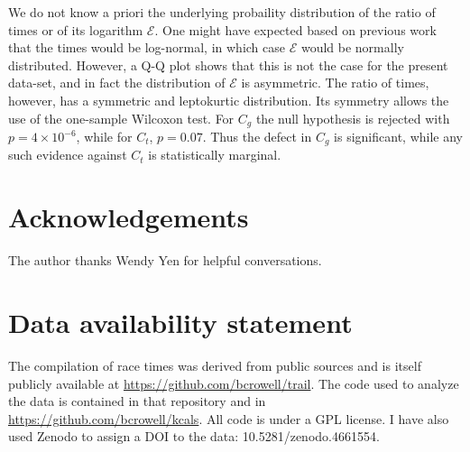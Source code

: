 \documentclass[10pt,letterpaper]{article}
\begin{document}
We do not know a priori the underlying probaility distribution of the ratio of times or of its
logarithm $\mathcal{E}$. One might have expected based on
previous work\cite{godsey} that the times would be log-normal, in which case $\mathcal{E}$ would
be normally distributed. However, a Q-Q plot shows that this is not the case for the present
data-set, and in fact the distribution of $\mathcal{E}$ is asymmetric. The ratio of times,
however, has a symmetric and leptokurtic distribution. Its symmetry allows the use of the
one-sample Wilcoxon test.
For $C_g$ the null hypothesis is rejected with $p=4\times10^{-6}$, while
for $C_t$, $p=0.07$. Thus the defect in $C_g$ is significant, while any such evidence against
$C_t$ is statistically marginal.


\section*{Acknowledgements}

The author thanks Wendy Yen for helpful conversations.

\section*{Data availability statement}

The compilation
of race times was derived from public sources and is itself publicly available at \url{https://github.com/bcrowell/trail}.
The code used to analyze the data is contained in that repository and in \url{https://github.com/bcrowell/kcals}.
All code is under a GPL license.
I have also used Zenodo to
assign a DOI to the data: 10.5281/zenodo.4661554.

% 
\end{document}
